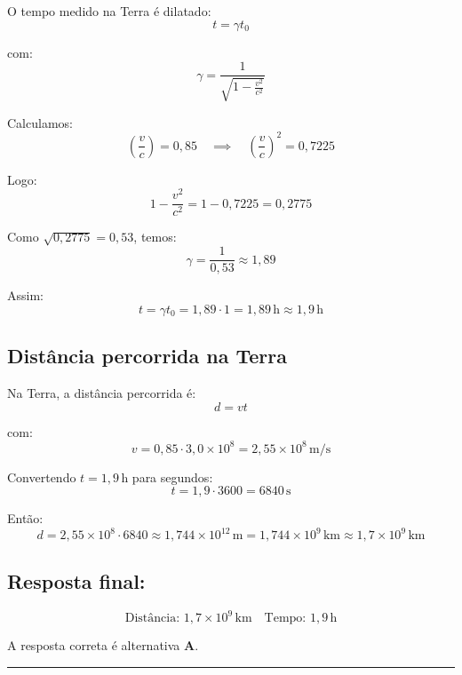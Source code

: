\begin{flushleft}
O tempo medido na Terra é dilatado:
\[
t = \gamma t_0
\]

com:
\[
\gamma = \frac{1}{\sqrt{1-\frac{v^2}{c^2}}}
\]

Calculamos:
\[
\left( \frac{v}{c} \right) = 0{,}85 \quad \implies \quad \left( \frac{v}{c} \right)^2 = 0{,}7225
\]

Logo:
\[
1 - \frac{v^2}{c^2} = 1 - 0{,}7225 = 0{,}2775
\]

Como \(\sqrt{0{,}2775} = 0{,}53\), temos:
\[
\gamma = \frac{1}{0{,}53} \approx 1{,}89
\]

Assim:
\[
t = \gamma t_0 = 1{,}89 \cdot 1 = 1{,}89\,\mathrm{h} \approx 1{,}9\,\mathrm{h}
\]

\subsection*{Distância percorrida na Terra}

Na Terra, a distância percorrida é:
\[
d = v t
\]

com:
\[
v = 0{,}85 \cdot 3{,}0 \times 10^8 = 2{,}55 \times 10^8\, \mathrm{m/s}
\]

Convertendo \(t = 1{,}9\,\mathrm{h}\) para segundos:
\[
t = 1{,}9 \cdot 3600 = 6840\,\mathrm{s}
\]

Então:
\[
d = 2{,}55 \times 10^8 \cdot 6840 \approx 1{,}744 \times 10^{12}\,\mathrm{m} = 1{,}744 \times 10^9\,\mathrm{km} \approx 1{,}7 \times 10^9\,\mathrm{km}
\]

\subsection*{Resposta final:}

\[
\boxed{
\text{Distância: } 1{,}7 \times 10^9\,\mathrm{km} \quad \text{Tempo: } 1{,}9\,\mathrm{h}
}
\]


A resposta correta é alternativa \colorbox{green!50}{\textbf{A}}.
\end{flushleft}

\noindent\rule{\linewidth}{0.6pt}\\


